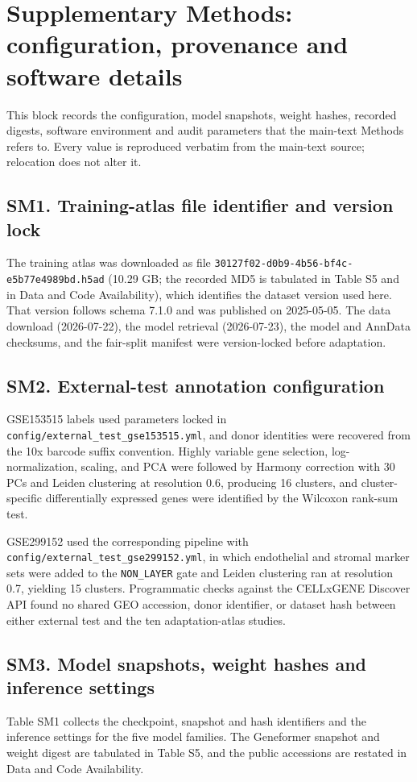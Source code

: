 \documentclass[12pt,a4paper]{article}
\begin{document}
\section*{Supplementary Methods: configuration, provenance and software details}
\label{sec:suppmethods}

This block records the configuration, model snapshots, weight hashes, recorded digests, software environment and audit parameters that the main-text Methods refers to. Every value is reproduced verbatim from the main-text source; relocation does not alter it.

\subsection*{SM1. Training-atlas file identifier and version lock}
The training atlas was downloaded as file \texttt{30127f02-d0b9-4b56-bf4c-e5b77e4989bd.h5ad} (10.29 GB; the recorded MD5 is tabulated in Table S5 and in Data and Code Availability), which identifies the dataset version used here. That version follows schema 7.1.0 and was published on 2025-05-05. The data download (2026-07-22), the model retrieval (2026-07-23), the model and AnnData checksums, and the fair-split manifest were version-locked before adaptation.

\subsection*{SM2. External-test annotation configuration}
GSE153515 labels used parameters locked in \texttt{config/external\_test\_gse153515.yml}, and donor identities were recovered from the 10x barcode suffix convention. Highly variable gene selection, log-normalization, scaling, and PCA were followed by Harmony correction with 30 PCs and Leiden clustering at resolution 0.6, producing 16 clusters, and cluster-specific differentially expressed genes were identified by the Wilcoxon rank-sum test.

GSE299152 used the corresponding pipeline with \texttt{config/external\_test\_gse299152.yml}, in which endothelial and stromal marker sets were added to the \texttt{NON\_LAYER} gate and Leiden clustering ran at resolution 0.7, yielding 15 clusters. Programmatic checks against the CELLxGENE Discover API found no shared GEO accession, donor identifier, or dataset hash between either external test and the ten adaptation-atlas studies.

\subsection*{SM3. Model snapshots, weight hashes and inference settings}
Table SM1 collects the checkpoint, snapshot and hash identifiers and the inference settings for the five model families. The Geneformer snapshot and weight digest are tabulated in Table S5, and the public accessions are restated in Data and Code Availability.
\end{document}
